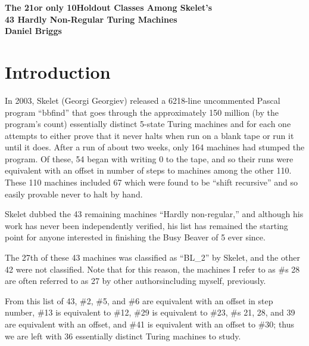 \documentclass[12pt]{article}
\begin{document}
\begin{center}
 
{\bf\large The 21\textemdash or only 10\textemdash Holdout Classes Among Skelet's\\ 43 Hardly Non-Regular Turing Machines} \\
 
 
 
       \textbf{Daniel Briggs}


\end{center}


\section*{Introduction}
In 2003, Skelet (Georgi Georgiev) released a 6218-line uncommented Pascal program ``bbfind'' that goes through the approximately 150 million (by the program's count) essentially distinct 5-state Turing machines and for each one attempts to either prove that it never halts when run on a blank tape or run it until it does. After a run of about two weeks, only 164 machines had stumped the program. Of these, 54 began with writing 0 to the tape, and so their runs were equivalent with an offset in number of steps to machines among the other 110. These 110 machines included 67 which were found to be ``shift recursive'' and so easily provable never to halt by hand.

Skelet dubbed the 43 remaining machines ``Hardly non-regular,'' and although his work has never been independently verified, his list has remained the starting point for anyone interested in finishing the Busy Beaver of 5 ever since.

The 27th of these 43 machines was classified as ``BL\_2'' by Skelet, and the other 42 were not classified. Note that for this reason, the machines I refer to as \#s 28 are often referred to as 27 by other authors\textemdash including myself, previously.

From this list of 43, \#2, \#5, and \#6 are equivalent with an offset in step number, \#13 is equivalent to \#12,  \#29 is equivalent to \#23, \#s 21, 28, and 39 are equivalent with an offset,  and \#41 is equivalent with an offset to \#30; thus we are left with 36 essentially distinct Turing machines to study.
\end{document}
